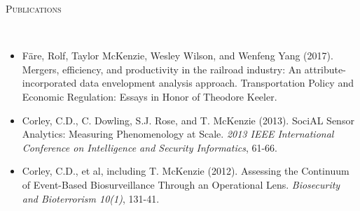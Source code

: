 \documentclass[11pt]{article}
\newenvironment{changemargin}[2]{%
  \begin{list}{}{%
    \setlength{\topsep}{0pt}%
    \setlength{\leftmargin}{#1}%
    \setlength{\rightmargin}{#2}%
    \setlength{\listparindent}{\parindent}%
    \setlength{\itemindent}{\parindent}%
    \setlength{\parsep}{\parskip}%
  }%
  \item[]}{\end{list}
}
\newcommand{\lineover}{
	\begin{changemargin}{-0.05in}{-0.05in}
		\vspace*{-8pt}
		\hrulefill \\
		\vspace*{-2pt}
	\end{changemargin}
}
\newcommand{\header}[1]{
	\begin{changemargin}{-0.5in}{-0.5in}
		\scshape{#1}\\
  	\lineover
	\end{changemargin}
}
\newenvironment{body} {
	\vspace*{-16pt}
	\begin{changemargin}{-0.25in}{-0.5in}
  }	
	{\end{changemargin}
}
\begin{document}
%
%	
%	

\header{Publications}

\begin{body}
\vspace{14pt}
\begin{itemize}
	\item F\"{a}re, Rolf, Taylor McKenzie, Wesley Wilson, and Wenfeng Yang (2017). Mergers, efficiency, and productivity in the railroad industry: An attribute-incorporated data envelopment analysis approach. Transportation Policy and Economic Regulation: Essays in Honor of Theodore Keeler.
	\item Corley, C.D., C. Dowling, S.J. Rose, and T. McKenzie (2013). SociAL Sensor Analytics: Measuring Phenomenology at Scale. \textit{2013 IEEE International Conference on Intelligence and Security Informatics}, 61-66.
	\item Corley, C.D., et al, including T. McKenzie (2012). Assessing the Continuum of Event-Based Biosurveillance Through an Operational Lens. \textit{Biosecurity and Bioterrorism 10(1)}, 131-41.
\end{itemize}
\end{body}
\end{document}
